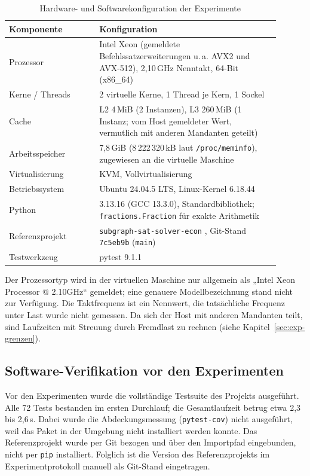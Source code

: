 \documentclass[a4paper,12pt,twoside]{report}
\theoremstyle{definition}
\begin{document}
\begin{table}[htbp]
\centering
\small
\caption{Hardware- und Softwarekonfiguration der Experimente}
\label{tab:hardware}
\begin{tabular}{p{0.30\linewidth}p{0.60\linewidth}}
\toprule
\textbf{Komponente} & \textbf{Konfiguration} \\
\midrule
Prozessor & Intel Xeon (gemeldete Befehlssatzerweiterungen u.\,a. AVX2 und AVX-512), 2{,}10\,GHz Nenntakt, 64-Bit (x86\_64) \\
Kerne / Threads & 2 virtuelle Kerne, 1 Thread je Kern, 1 Sockel \\
Cache & L2 4\,MiB (2 Instanzen), L3 260\,MiB (1 Instanz; vom Host gemeldeter Wert, vermutlich mit anderen Mandanten geteilt) \\
Arbeitsspeicher & 7{,}8\,GiB (8\,222\,320\,kB laut \texttt{/proc/meminfo}), zugewiesen an die virtuelle Maschine \\
Virtualisierung & KVM, Vollvirtualisierung \\
Betriebssystem & Ubuntu 24.04.5 LTS, Linux-Kernel 6.18.44 \\
Python & 3.13.16 (GCC 13.3.0), Standardbibliothek; \texttt{fractions.Fraction} für exakte Arithmetik \\
Referenzprojekt & \texttt{subgraph-sat-solver-econ} \cite{sat2026}, Git-Stand \texttt{7c5eb9b} (\texttt{main}) \\
Testwerkzeug & pytest 9.1.1 \\
\bottomrule
\end{tabular}
\end{table}

Der Prozessortyp wird in der virtuellen Maschine nur allgemein als „Intel Xeon Processor @ 2.10GHz“ gemeldet; eine genauere Modellbezeichnung stand nicht zur Verfügung. Die Taktfrequenz ist ein Nennwert, die tatsächliche Frequenz unter Last wurde nicht gemessen. Da sich der Host mit anderen Mandanten teilt, sind Laufzeiten mit Streuung durch Fremdlast zu rechnen (siehe Kapitel~\ref{sec:exp-grenzen}).

\subsection{Software-Verifikation vor den Experimenten}
Vor den Experimenten wurde die vollständige Testsuite des Projekts ausgeführt. Alle 72 Tests bestanden im ersten Durchlauf; die Gesamtlaufzeit betrug etwa 2{,}3 bis 2{,}6\,s. Dabei wurde die Abdeckungsmessung (\texttt{pytest-cov}) nicht ausgeführt, weil das Paket in der Umgebung nicht installiert werden konnte. Das Referenzprojekt wurde per Git bezogen und über den Importpfad eingebunden, nicht per \texttt{pip} installiert. Folglich ist die Version des Referenzprojekts im Experimentprotokoll manuell als Git-Stand eingetragen.
\end{document}
